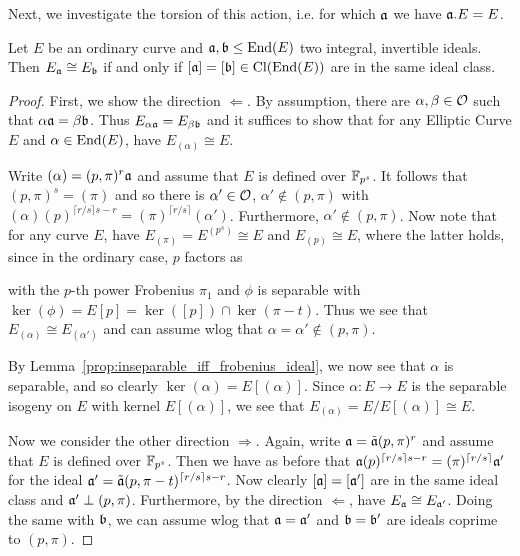 Next, we investigate the torsion of this action, i.e. for which $\mathfrak{a}$ we have $\mathfrak{a}.E = E$.
\begin{lemma}
    Let $E$ be an ordinary curve and $\mathfrak{a}, \mathfrak{b} \leq \mathrm{End}(E)$ two integral, invertible ideals.
    Then $E_{\mathfrak{a}} \cong E_{\mathfrak{b}}$ if and only if $[\mathfrak{a}] = [\mathfrak{b}] \in \mathrm{Cl}(\mathrm{End}(E))$ are in the same ideal class.
\end{lemma}
\begin{proof}
    First, we show the direction $\Leftarrow$.
    By assumption, there are $\alpha, \beta \in \mathcal{O}$ such that $\alpha\mathfrak{a} = \beta\mathfrak{b}$.
    Thus $E_{\alpha\mathfrak{a}} = E_{\beta\mathfrak{b}}$ and it suffices to show that for any Elliptic Curve $E$ and $\alpha \in \mathrm{End}(E)$, have $E_{(\alpha)} \cong E$.

    Write $(\alpha) = (p, \pi)^r \mathfrak{a}$ and assume that $E$ is defined over $\mathbb{F}_{p^s}$.
    It follows that $(p, \pi)^s = (\pi)$ and so there is $\alpha' \in \mathcal{O}$, $\alpha' \notin (p, \pi)$ with $(\alpha)(p)^{\lceil r/s \rceil s - r} = (\pi)^{\lceil r/s \rceil} (\alpha')$.
    Furthermore, $\alpha' \notin (p, \pi)$.
    Now note that for any curve $E$, have $E_{(\pi)} = E^{(p^s)} \cong E$ and $E_{(p)} \cong E$, where the latter holds, since in the ordinary case, $p$ factors as
    \begin{center}
    \end{center}
    with the $p$-th power Frobenius $\pi_1$ and $\phi$ is separable with $\ker(\phi) = E[p] = \ker([p]) \cap \ker(\pi - t)$.
    Thus we see that $E_{(\alpha)} \cong E_{(\alpha')}$ and can assume wlog that $\alpha = \alpha' \notin (p, \pi)$.

    By Lemma~\ref{prop:inseparable_iff_frobenius_ideal}, we now see that $\alpha$ is separable, and so clearly $\ker(\alpha) = E[(\alpha)]$.
    Since $\alpha: E \to E$ is the separable isogeny on $E$ with kernel $E[(\alpha)]$, we see that $E_{(\alpha)} = E/E[(\alpha)] \cong E$.

    Now we consider the other direction $\Rightarrow$.
    Again, write $\mathfrak{a} = \tilde{\mathfrak{a}}(p, \pi)^r$ and assume that $E$ is defined over $\mathbb{F}_{p^s}$.
    Then we have as before that $\mathfrak{a} (p)^{\lceil r/s \rceil s - r} = (\pi)^{\lceil r/s \rceil} \mathfrak{a}'$ for the ideal $\mathfrak{a}' = \tilde{\mathfrak{a}} (p, \pi - t)^{\lceil r/s \rceil s - r}$.
    Now clearly $[\mathfrak{a}] = [\mathfrak{a}']$ are in the same ideal class and $\mathfrak{a}' \perp (p, \pi)$.
    Furthermore, by the direction $\Leftarrow$, have $E_{\mathfrak{a}} \cong E_{\mathfrak{a}'}$.
    Doing the same with $\mathfrak{b}$, we can assume wlog that $\mathfrak{a} = \mathfrak{a}'$ and $\mathfrak{b} = \mathfrak{b}'$ are ideals coprime to $(p, \pi)$.


\end{proof}
